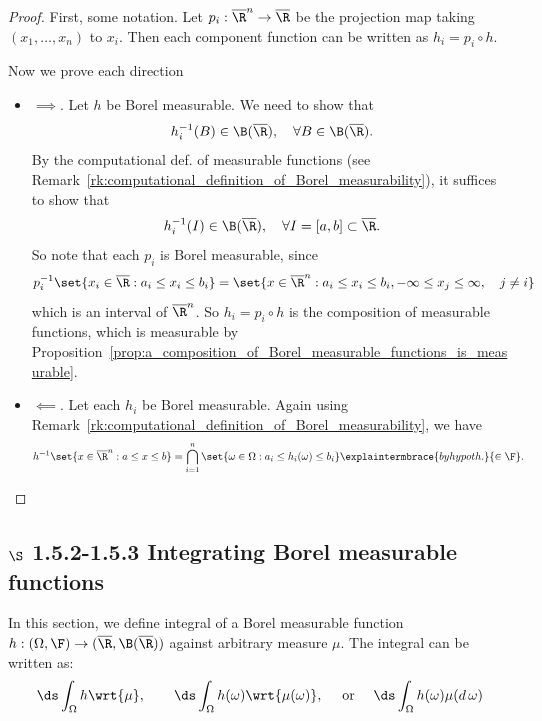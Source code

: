 \documentclass{article} %
\begin{document}
\begin{proof}
First, some notation.  Let $p_i : \overline{\R}^n \to \overline{\R}$ be the projection map taking $(x_1,\hdots, x_n)$ to $x_i$.   Then each component function can be written as $h_i = p_i \circ h$.

Now we prove each direction
\begin{itemize}
\item $\boxed{\implies}$.  Let $h$ be Borel measurable. We need to show that
\[ h_i^{-1}(B) \in \B(\overline{\R}), \quad \forall B \in \B(\overline{\R}). \]
By the computational def. of measurable functions (see Remark~\ref{rk:computational_definition_of_Borel_measurability}), it suffices to show that 
\[ h_i^{-1}(I) \in \B(\overline{\R}), \quad \forall I = [a,b] \subset \overline{\R}.\]
So note that each $p_i$ is Borel measurable, since 
 \[ p_i^{-1} \set{x_i \in \overline{\R} : a_i \leq x_i \leq b_i} = \set{x \in \overline{\R}^n : a_i \leq x_i \leq b_i,  -\infty \leq x_j \leq \infty, \quad j \neq i }\]
 which is an interval of $\overline{\R}^n$.  So $h_i = p_i \circ h$ is the composition of measurable functions, which is measurable by Proposition~\ref{prop:a_composition_of_Borel_measurable_functions_is_measurable}.

\item $\boxed{\impliedby}$. Let each $h_i$ be Borel measurable.   Again using Remark~\ref{rk:computational_definition_of_Borel_measurability}, we have
\begin{align*}
h^{-1} \set{x \in \overline{\R}^n : a \leq x \leq b} &= \bigcap_{i=1}^n \set{\omega \in \Omega : a_i \leq h_i(\omega) \leq b_i} \explaintermbrace{by hypoth.}{\in \F}.
\end{align*}
  
\end{itemize}
 	
\end{proof}


\subsection{$\S$ 1.5.2-1.5.3 Integrating  Borel measurable functions}

In this section, we define integral of a Borel measurable function $h : (\Omega, \F) \to (\overline{\R}, \B(\overline{\R}))$ against arbitrary measure $\mu$.  The integral can be written as:
\begin{align}
 \ds\int_{\Omega} h \wrt{\mu}, \quad \quad \ds\int_{\Omega} h(\omega) \wrt{\mu(\omega)}, \quad \text{ or } \quad \ds\int_{\Omega} h(\omega) \mu(d \, \omega) 
\label{eq:notation_for_Borel_measurable_functions}
\end{align}
\end{document}
